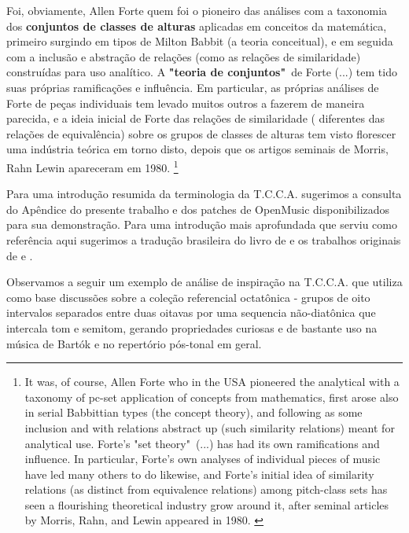 \documentclass[
	12pt,				%
	openright,			%
	twoside,			%
	a4paper,			%
	english,			%
	french,				%
	spanish,			%
	brazil				%
	]{abntex2}
\begin{document}
\begin{citacao}
Foi, obviamente, Allen Forte quem foi o pioneiro das análises com a taxonomia dos \textbf{conjuntos de classes de alturas} aplicadas em conceitos da matemática, primeiro surgindo em tipos de Milton Babbit (a teoria conceitual), e em seguida com a inclusão e abstração de relações (como as relações de similaridade) construídas para uso analítico. A \textbf{"teoria de conjuntos"}\ de Forte (...) tem tido suas próprias ramificações e influência. Em particular, as próprias análises de Forte de peças individuais tem levado muitos outros a fazerem de maneira parecida, e a ideia inicial de Forte das relações de similaridade ( diferentes das relações de equivalência) sobre os grupos de classes de alturas tem visto florescer uma indústria teórica em torno disto, depois que os artigos seminais de Morris, Rahn  Lewin apareceram em 1980. \cite[ p. 130]{rahn2004swerve}\footnote{
It was, of course, Allen Forte who in the USA pioneered the analytical with a taxonomy of pc-set application of concepts from mathematics, first arose also in serial Babbittian types (the concept theory), and following as some inclusion and with relations abstract up (such similarity relations) meant for analytical use. Forte's "set theory"\  (...) has had its own ramifications and influence. In particular, Forte's own analyses of individual pieces of music have led many others to do likewise, and Forte's initial idea of similarity relations (as distinct from equivalence relations) among pitch-class sets has seen a flourishing theoretical industry grow around it, after seminal articles by Morris, Rahn, and Lewin appeared in 1980. \cite[ p. 130, grifo nossos]{rahn2004swerve}}
\end{citacao}

Para uma introdução resumida da terminologia da T.C.C.A. sugerimos a consulta do Apêndice do presente trabalho e dos patches de OpenMusic disponibilizados para sua demonstração. Para uma introdução mais aprofundada que serviu como referência aqui sugerimos a tradução brasileira do livro de  e os trabalhos originais de  e .

Observamos a seguir um exemplo de análise de inspiração na T.C.C.A. que utiliza como base discussões sobre a coleção referencial octatônica - grupos de oito intervalos separados entre duas oitavas por uma sequencia não-diatônica que intercala tom e semitom, gerando propriedades curiosas e de bastante uso na música de Bartók e no repertório pós-tonal em geral.
\end{document}
